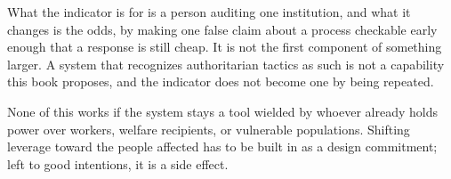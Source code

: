 What the indicator is for is a person auditing one institution, and what it changes is the odds, by making one false claim about a process checkable early enough that a response is still cheap. It is not the first component of something larger. A system that recognizes authoritarian tactics as such is not a capability this book proposes, and the indicator does not become one by being repeated.

None of this works if the system stays a tool wielded by whoever already holds power over workers, welfare recipients, or vulnerable populations. Shifting leverage toward the people affected has to be built in as a design commitment; left to good intentions, it is a side effect.
